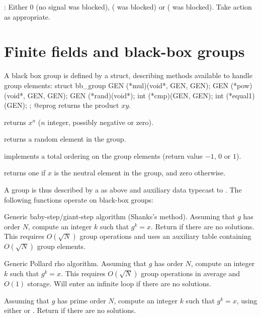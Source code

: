 : Either $0$ (no signal was blocked), 
( was blocked) or  ( was blocked).
Take action as appropriate.

\section{Finite fields and black-box groups}

A black box group is defined by a  struct, describing methods
available to handle group elements:
\bprog
    struct bb_group
    {
      GEN (*mul)(void*, GEN, GEN);
      GEN (*pow)(void*, GEN, GEN);
      GEN (*rand)(void*);
      int (*cmp)(GEN, GEN);
      int (*equal1)(GEN);
    };
@eprog
 returns the product $xy$.

 returns $x^n$ ($n$ integer, possibly negative or zero).

 returns a random element in the group.

 implements a total ordering on the group elements
(return value $-1$, $0$ or $1$).

 returns one if $x$ is the neutral element in the group,
and zero otherwise.

A group is thus described by a  as above and auxiliary
data typecast to . The following functions operate on black-box
groups:

 \break
Generic baby-step/giant-step algorithm (Shanks's method). Assuming
that $g$ has order $N$, compute an integer $k$ such that $g^k = x$.
Return  if there are no solutions. This requires
$O(\sqrt{N})$ group operations and uses an auxiliary table containing
$O(\sqrt{N})$ group elements.

 \break
Generic Pollard rho algorithm. Assuming that $g$ has order $N$, compute an
integer $k$ such that $g^k = x$. This requires $O(\sqrt{N})$ group operations
in average and $O(1)$ storage. Will enter an infinite loop if there are no
solutions.

 
Assuming that $g$ has prime order $N$, compute an integer $k$ such that
$g^k = x$, using either  or .
Return  if there are no solutions.

